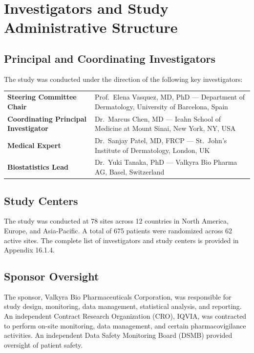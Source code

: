 \section{Investigators and Study Administrative Structure}

\subsection{Principal and Coordinating Investigators}

The study was conducted under the direction of the following key investigators:

\vspace{4pt}
\renewcommand{\arraystretch}{1.25}
\begin{tabularx}{\linewidth}{@{}>{\color{accent}\bfseries}l@{\hspace{6mm}}X@{}}
Steering Committee Chair           & Prof.\ Elena Vasquez, MD, PhD --- Department of Dermatology, University of Barcelona, Spain \\
Coordinating Principal Investigator & Dr.\ Marcus Chen, MD --- Icahn School of Medicine at Mount Sinai, New York, NY, USA \\
Medical Expert                     & Dr.\ Sanjay Patel, MD, FRCP --- St.\ John's Institute of Dermatology, London, UK \\
Biostatistics Lead                 & Dr.\ Yuki Tanaka, PhD --- Valkyra Bio Pharma AG, Basel, Switzerland \\
\end{tabularx}
\renewcommand{\arraystretch}{1.0}
\vspace{4pt}

\subsection{Study Centers}

The study was conducted at 78 sites across 12 countries in North America, Europe, and Asia-Pacific. A total of 675 patients were randomized across 62 active sites. The complete list of investigators and study centers is provided in Appendix 16.1.4.

\subsection{Sponsor Oversight}

The sponsor, Valkyra Bio Pharmaceuticals Corporation, was responsible for study design, monitoring, data management, statistical analysis, and reporting. An independent Contract Research Organization (CRO), IQVIA, was contracted to perform on-site monitoring, data management, and certain pharmacovigilance activities. An independent Data Safety Monitoring Board (DSMB) provided oversight of patient safety.

\newpage

